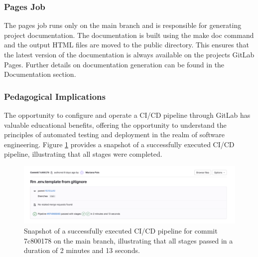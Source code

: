 \subsubsection{Pages Job}\label{pages-job}

The pages job runs only on the main branch and is responsible for
generating project documentation. The documentation is built using the
make doc command and the output HTML files are moved to the public
directory. This ensures that the latest version of the documentation is
always available on the project\textquotesingle s GitLab Pages. Further
details on documentation generation can be found in the Documentation
section.



\subsubsection{Pedagogical Implications}\label{pedagogical-implications}

The opportunity to configure and operate a CI/CD pipeline through GitLab
has valuable educational benefits, offering the opportunity to
understand the principles of automated testing and deployment in the
realm of software engineering. Figure \ref{fig:commit} provides a snapshot of a
successfully executed CI/CD pipeline, illustrating that all stages were
completed.

\begin{figure}[ht]
  \centering
  \includegraphics[width=\textwidth]{media/fig5.png}
  \caption{Snapshot of a successfully executed CI/CD pipeline for commit
  7c800178 on the main branch, illustrating that all stages passed in a
  duration of 2 minutes and 13 seconds.}
  \label{fig:commit}
\end{figure}

